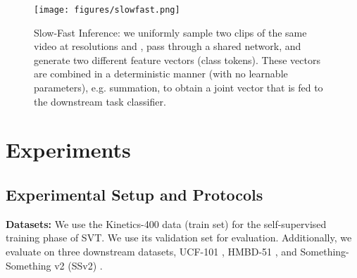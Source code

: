 \documentclass[10pt,twocolumn,letterpaper]{article}
\begin{document}
\begin{figure}[!t]
    \vspace{0.5em}
    \centering
    \texttt{[image: figures/slowfast.png]}
\vspace{-0.5em}
    \caption{Slow-Fast Inference: we uniformly sample two clips of the same video at resolutions  and , pass through a shared network, and generate two different feature vectors (class tokens). These vectors are combined in a deterministic manner (with no learnable parameters), e.g. summation, to obtain a joint vector that is fed to the downstream task classifier.
    }
    \label{fig:slowfast}
    \vspace{-1em}
\end{figure}
 \section{Experiments}
\label{sec:experiments}

\subsection{Experimental Setup and Protocols}
\label{subsec:exp_setup}

\noindent\textbf{Datasets:} 
We use the Kinetics-400 data \cite{kinetics400} (train set) for the self-supervised training phase of SVT. We use its validation set for evaluation. Additionally, we evaluate on three downstream datasets, UCF-101 \cite{soomro2012ucf}, HMBD-51 \cite{kuehne2011hmdb}, and Something-Something v2 (SSv2) \cite{goyal2017something}. 
\end{document}

